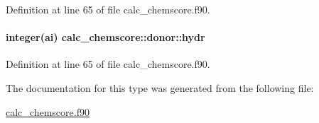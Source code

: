 Definition at line 65 of file calc\-\_\-chemscore.\-f90.

\hypertarget{structcalc__chemscore_1_1donor_a4d1a0a2acb614f07bf76ea0024cc5fad}{
\paragraph[{hydr}]{\setlength{\rightskip}{0pt plus 5cm}integer(ai) calc\-\_\-chemscore\-::donor\-::hydr}}\label{structcalc__chemscore_1_1donor_a4d1a0a2acb614f07bf76ea0024cc5fad}


Definition at line 65 of file calc\-\_\-chemscore.\-f90.



The documentation for this type was generated from the following file\-:\begin{DoxyCompactItemize}
\item 
\hyperlink{calc__chemscore_8f90}{calc\-\_\-chemscore.\-f90}\end{DoxyCompactItemize}

